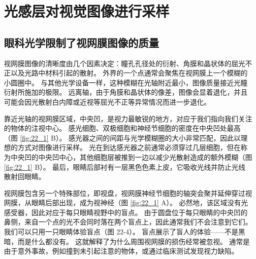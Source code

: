 \section{光感层对视觉图像进行采样}


\subsection{眼科光学限制了视网膜图像的质量}
视网膜图像的清晰度由几个因素决定：瞳孔孔径处的衍射、角膜和晶状体的屈光不正以及光路中材料引起的散射。 
外界的一个点通常会聚焦在视网膜上一个模糊的小圆圈中。 与其他光学设备一样，这种模糊在光轴附近最小，图像质量接近光瞳衍射所施加的极限。 
远离轴，由于角膜和晶状体的像差，图像会显着退化，并且可能会因光散射白内障或近视等屈光不正等异常情况而进一步退化。


靠近光轴的视网膜区域，中央凹，是视力最敏锐的地方，对应于我们指向我们关注的物体的注视中心。 
感光细胞、双极细胞和神经节细胞的密度在中央凹处最高（图 \ref{fig:22_1} B）。 
感光器之间的间距与光学模糊圈的大小非常匹配，因此以理想的方式对图像进行采样。 
光在到达感光器之前通常必须穿过几层细胞，但在称为中央凹的中央凹中心，其他细胞层被推到一边以减少光散射造成的额外模糊（图 \ref{fig:22_1} B）。 
最后，眼睛后部衬有一层黑色色素上皮，它吸收光线并防止光线散射回眼睛。


视网膜包含另一个特殊部位，即视盘，视网膜神经节细胞的轴突会聚并延伸穿过视网膜，从眼睛后部出现，成为视神经（图 \ref{fig:22_1} A）。 
必然地，该区域没有光感受器，因此对应于每只眼睛视野中的盲点。 
由于圆盘位于每只眼睛的中央凹的鼻侧，来自一个点的光不会同时落在两个盲点上，因此通常我们不会注意到它们。 
我们可以只用一只眼睛体验盲点（图 22-4）。 
盲点展示了盲人的体验——不是黑暗，而是什么都没有。 
这就解释了为什么周围视网膜的损伤经常被忽视。 
通常是由于意外事故，例如撞到未引起注意的物体，或通过临床测试发现视力缺陷。

